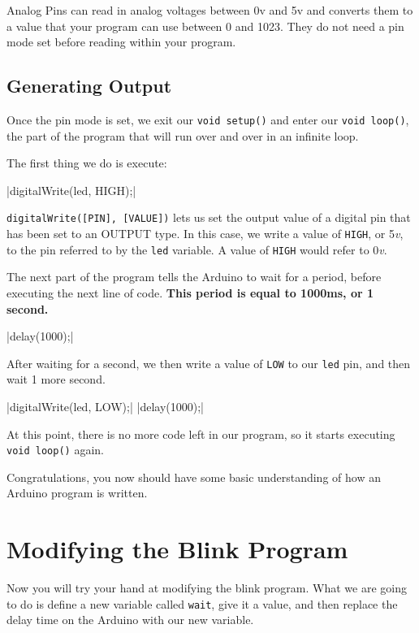 \documentclass[11pt,a4paper]{article}
\begin{document}
Analog Pins can read in analog voltages between 0v and 5v and converts them to a value that your program can use between 0 and 1023.  They do not need a pin mode set before reading within your program.


\subsection{Generating Output} %
\label{sub:generating_output}

Once the pin mode is set, we exit our \texttt{void setup()} and enter our \texttt{void loop()}, the part of the program that will run over and over in an infinite loop. 

The first thing we do is execute: 

|digitalWrite(led, HIGH);|

\texttt{digitalWrite([PIN], [VALUE])} lets us set the output value of a digital pin that has been set to an OUTPUT type.  In this case, we write a value of \texttt{HIGH}, or 5\emph{v}, to the pin referred to by the \texttt{led} variable.  A value of \texttt{HIGH} would refer to 0\emph{v}.

The next part of the program tells the Arduino to wait for a period, before executing the next line of code.  \textbf{This period is equal to 1000ms, or 1 second.}

|delay(1000);|

After waiting for a second, we then write a value of \texttt{LOW} to our \texttt{led} pin, and then wait 1 more second.

|digitalWrite(led, LOW);|
|delay(1000);|

At this point, there is no more code left in our program, so it starts executing \texttt{void loop()} again.


Congratulations, you now should have some basic understanding of how an Arduino program is written.


\section{Modifying the Blink Program} %
\label{sub:modifying_the_blink_program}

Now you will try your hand at modifying the blink program.  What we are going to do is define a new variable called \texttt{wait}, give it a value, and then replace the delay time on the Arduino with our new variable. 
\end{document}
